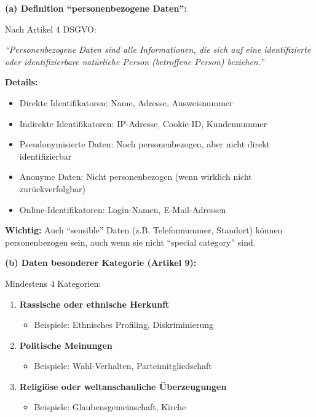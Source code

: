 \documentclass[12pt,a4paper]{article}
\begin{document}
\begin{tcolorbox}[colback=solutionbg, colframe=black!30]

\textbf{(a) Definition ``personenbezogene Daten'':} \checkmark

Nach Artikel 4 DSGVO:

\textit{``Personenbezogene Daten sind alle Informationen, die sich auf eine identifizierte oder identifizierbare natürliche Person (betroffene Person) beziehen.''}

\textbf{Details:}

\begin{itemize}
    \item Direkte Identifikatoren: Name, Adresse, Ausweisnummer
    \item Indirekte Identifikatoren: IP-Adresse, Cookie-ID, Kundennummer
    \item Pseudonymisierte Daten: Noch personenbezogen, aber nicht direkt identifizierbar
    \item Anonyme Daten: Nicht personenbezogen (wenn wirklich nicht zurückverfolgbar)
    \item Online-Identifikatoren: Login-Namen, E-Mail-Adressen
\end{itemize}

\textbf{Wichtig:} Auch ``sensible'' Daten (z.B. Telefonnummer, Standort) können personenbezogen sein, auch wenn sie nicht ``special category'' sind.

\textbf{(b) Daten besonderer Kategorie (Artikel 9):} \checkmark

Mindestens 4 Kategorien:

\begin{enumerate}[1.]
    \item \textbf{Rassische oder ethnische Herkunft}
    \begin{itemize}
        \item Beispiele: Ethnisches Profiling, Diskriminierung
    \end{itemize}
    
    \item \textbf{Politische Meinungen}
    \begin{itemize}
        \item Beispiele: Wahl-Verhalten, Parteimitgliedschaft
    \end{itemize}
    
    \item \textbf{Religiöse oder weltanschauliche Überzeugungen}
    \begin{itemize}
        \item Beispiele: Glaubensgemeinschaft, Kirche
    \end{itemize}
    

\end{enumerate}
\end{tcolorbox}
\end{document}
